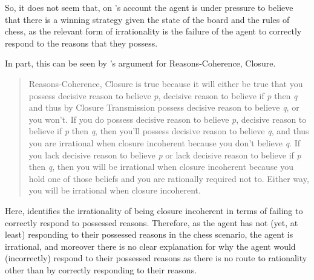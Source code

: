 \documentclass[10pt]{article}
\begin{document}
So, it does not seem that, on \citeauthor{Lord:2018aa}'s account the agent is under pressure to believe that there is a winning strategy given the state of the board and the rules of chess, as the relevant form of irrationality is the failure of the agent to correctly respond to the reasons that they possess.

In part, this can be seen by \citeauthor{Lord:2018aa}'s argument for Reasons-Coherence, Closure.

\begin{quote}
  Reasons-Coherence, Closure is true because it will either be true that you possess decisive reason to believe \emph{p}, decisive reason to believe if \emph{p} then \emph{q} and thus by Closure Transmission possess decisive reason to believe \emph{q}, or you won't.
  If you do possess decisive reason to believe \emph{p}, decisive reason to believe if \emph{p} then \emph{q}, then you'll possess decisive reason to believe \emph{q}, and thus you are irrational when closure incoherent because you don't believe \emph{q}.
  If you lack decisive reason to believe \emph{p} or lack decisive reason to believe if \emph{p} then \emph{q}, then you will be irrational when closure incoherent because you hold one of those beliefs and you are rationally required not to.
  Either way, you will be irrational when closure incoherent.
\end{quote}

Here, \citeauthor{Lord:2018aa} identifies the irrationality of being closure incoherent in terms of failing to correctly respond to possessed reasons.
Therefore, as the agent has not (yet, at least) responding to their possessed reasons in the chess scenario, the agent is irrational, and moreover there is no clear explanation for why the agent would (incorrectly) respond to their possessed reasons as there is no route to rationality other than by correctly responding to their reasons.




\newpage

\printbibliography
\end{document}
